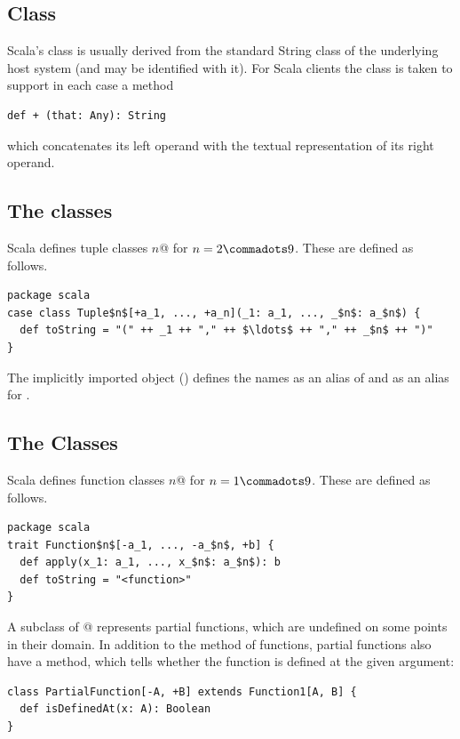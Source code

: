 \subsection{Class \large{}}

Scala's \lstinline@String@ class is usually derived from the standard String
class of the underlying host system (and may be identified with
it). For Scala clients the class is taken to support in each case a
method
\begin{lstlisting}
def + (that: Any): String 
\end{lstlisting}
which concatenates its left operand with the textual representation of its
right operand.

\subsection{The \large{} classes}

Scala defines tuple classes \lstinline@Tuple$n$@ for $n = 2 \commadots 9$.
These are defined as follows.

\begin{lstlisting}
package scala 
case class Tuple$n$[+a_1, ..., +a_n](_1: a_1, ..., _$n$: a_$n$) {
  def toString = "(" ++ _1 ++ "," ++ $\ldots$ ++ "," ++ _$n$ ++ ")"
}
\end{lstlisting}

The implicitly imported  object () defines
the names  as an alias of  and 
as an alias for .

\subsection{The \large{} Classes}
\label{sec:cls-function}

Scala defines function classes \lstinline@Function$n$@ for $n = 1 \commadots 9$.
These are defined as follows.

\begin{lstlisting}
package scala 
trait Function$n$[-a_1, ..., -a_$n$, +b] {
  def apply(x_1: a_1, ..., x_$n$: a_$n$): b 
  def toString = "<function>" 
}
\end{lstlisting}

A subclass of @ represents partial functions,
which are undefined on some points in their domain. In addition to the
 method of functions, partial functions also have a
 method, which tells whether the function is defined
at the given argument:
\begin{lstlisting}
class PartialFunction[-A, +B] extends Function1[A, B] {
  def isDefinedAt(x: A): Boolean
}
\end{lstlisting}

